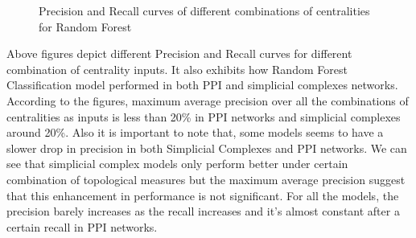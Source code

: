 \documentclass[9pt]{article}
\begin{document}
\begin{figure}[!htb]
\endminipage
\caption{Precision and Recall curves of different combinations of centralities for Random Forest}
\end{figure}

Above figures depict different Precision and Recall curves for different combination of centrality inputs. It also exhibits how Random Forest Classification model performed in both PPI and simplicial complexes networks. According to the figures, maximum average precision over all the combinations of centralities as inputs is less than 20\% in PPI networks and simplicial complexes around 20\%. Also it is important to note that, some models seems to have a slower drop in precision in both Simplicial Complexes and PPI networks. We can see that simplicial complex models only perform better under certain combination of topological measures but the maximum average precision suggest that this enhancement in performance is not significant. For all the models, the precision barely increases as the recall increases and it’s almost constant after a certain recall in PPI networks.
\end{document}
